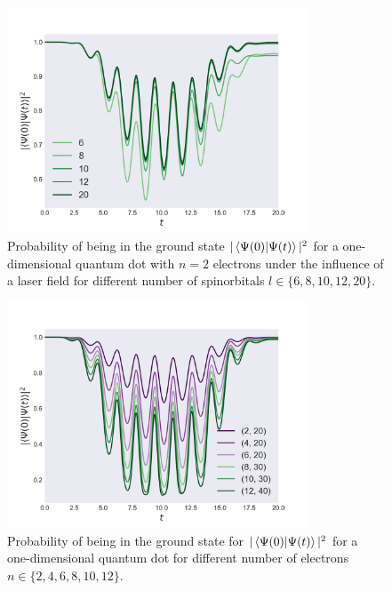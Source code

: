 \begin{figure}
    \centering
    \includegraphics[width=0.8\textwidth]{results/figures/1D/n=2overlap.png} 
    \caption{Probability of being in the ground state $|\braket*{\Psi(0)}{\Psi(t)}|^2$
        for a one-dimensional quantum dot with $n=2$ electrons under 
        the influence of a laser field for different number of spinorbitals 
        $l\in\{6,8,10,12,20\}$.
    }
    \label{fig:1d_n2_overlap}
\end{figure}

\begin{figure}
    \centering
    \includegraphics[width=0.8\textwidth]{results/figures/1D/n_compare_overlap.png} 
    \caption{Probability of being in the ground state for $|\braket*{\Psi(0)}{\Psi(t)}|^2$
        for a one-dimensional quantum dot for different number of electrons 
        $n\in\{2,4,6,8,10,12\}$.
    }
    \label{}
\end{figure}

